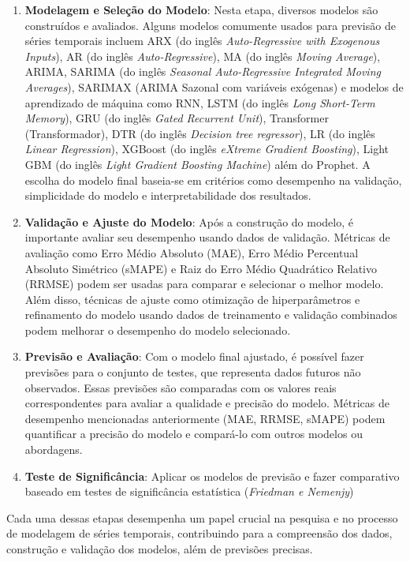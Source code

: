 \begin{enumerate}[start=1, label={\textbf{Etapa} \arabic*}]
	\item \label{etp:5} \textbf{Modelagem e Seleção do Modelo}: Nesta etapa, diversos modelos são construídos e avaliados. Alguns modelos comumente usados para previsão de séries temporais incluem ARX (do inglês \textit{Auto-Regressive with Exogenous Inputs}), AR (do inglês \textit{Auto-Regressive}), MA (do inglês \textit{Moving Average}), ARIMA, SARIMA (do inglês \textit{Seasonal Auto-Regressive Integrated Moving Averages}), SARIMAX (ARIMA Sazonal com variáveis exógenas) e modelos de aprendizado de máquina como RNN, LSTM (do inglês \textit{Long Short-Term Memory}), GRU (do inglês \textit{Gated Recurrent Unit}), Transformer (Transformador), DTR (do inglês \textit{Decision tree regressor}), LR (do inglês \textit{Linear Regression}), XGBoost (do inglês \textit{eXtreme Gradient Boosting}), Light GBM (do inglês \textit{Light Gradient Boosting Machine}) além do Prophet. A escolha do modelo final baseia-se em critérios como desempenho na validação, simplicidade do modelo e interpretabilidade dos resultados.
	
	\item \label{etp:6} \textbf{Validação e Ajuste do Modelo}: Após a construção do modelo, é importante avaliar seu desempenho usando dados de validação. Métricas de avaliação como Erro Médio Absoluto (MAE), Erro Médio Percentual Absoluto Simétrico (sMAPE) e Raiz do Erro Médio Quadrático Relativo (RRMSE) podem ser usadas para comparar e selecionar o melhor modelo. Além disso, técnicas de ajuste como otimização de hiperparâmetros e refinamento do modelo usando dados de treinamento e validação combinados podem melhorar o desempenho do modelo selecionado.
	
	\item \label{etp:7} \textbf{Previsão e Avaliação}: Com o modelo final ajustado, é possível fazer previsões para o conjunto de testes, que representa dados futuros não observados. Essas previsões são comparadas com os valores reais correspondentes para avaliar a qualidade e precisão do modelo. Métricas de desempenho mencionadas anteriormente (MAE, RRMSE, sMAPE) podem quantificar a precisão do modelo e compará-lo com outros modelos ou abordagens.
	
	\item \label{etp:8} \textbf{Teste de Significância}: Aplicar os modelos de previsão e fazer comparativo baseado em testes de significância estatística (\textit{Friedman e Nemenjy})

	
\end{enumerate}

Cada uma dessas etapas desempenha um papel crucial na pesquisa e no processo de modelagem de séries temporais, contribuindo para a compreensão dos dados, construção e validação dos modelos, além de previsões precisas.




    